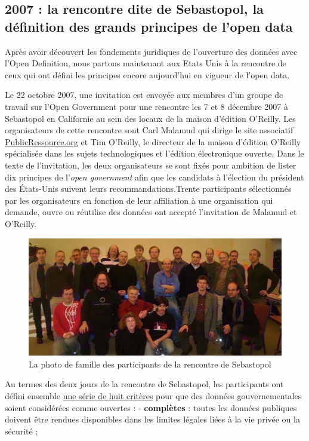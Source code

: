 \documentclass[]{book}
\theoremstyle{definition}
\theoremstyle{definition}
\theoremstyle{definition}
\theoremstyle{remark}
\begin{document}
\subsection{2007 : la rencontre dite de Sebastopol, la définition des
grands principes de l'open
data}\label{la-rencontre-dite-de-sebastopol-la-definition-des-grands-principes-de-lopen-data}

Après avoir découvert les fondements juridiques de l'ouverture des
données avec l'Open Definition, nous partons maintenant aux Etats Unis à
la rencontre de ceux qui ont défini les principes encore aujourd'hui en
vigueur de l'open data.

Le 22 octobre 2007, une invitation est envoyée aux membres d'un groupe
de travail sur l'Open Government pour une rencontre les 7 et 8 décembre
2007 à Sebastopol en Californie au sein des locaux de la maison
d'édition O'Reilly. Les organisateurs de cette rencontre sont Carl
Malamud qui dirige le site associatif \url{PublicRessource.org} et Tim
O'Reilly, le directeur de la maison d'édition O'Reilly spécialisée dans
les sujets technologiques et l'édition électronique ouverte. Dans le
texte de l'invitation, les deux organisateurs se sont fixés pour
ambition de lister dix principes de l'\emph{open government} afin que
les candidats à l'élection du président des États-Unis suivent leurs
recommandations.Trente participants sélectionnés par les organisateurs
en fonction de leur affiliation à une organisation qui demande, ouvre ou
réutilise des données ont accepté l'invitation de Malamud et O'Reilly.

\begin{figure}

{\centering \includegraphics[width=0.7\linewidth]{./img/photofamille} 

}

\caption{La photo de famille des participants de la rencontre de Sebastopol}\label{fig:unnamed-chunk-1}
\end{figure}

Au termes des deux jours de la rencontre de Sebastopol, les participants
ont défini ensemble \href{www.opengovdata.org}{une série de huit
critères} pour que des données gouvernementales soient considérées comme
ouvertes : - \textbf{complètes} : toutes les données publiques doivent
être rendues disponibles dans les limites légales liées à la vie privée
ou la sécurité ;
\end{document}
